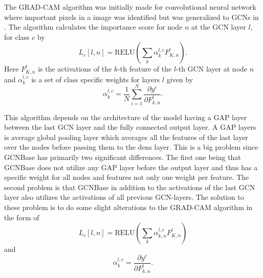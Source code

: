 The GRAD-CAM algorithm was initially made for convolutional neural network where important pixels in a image was identified \cite{} but was generalized to GCNs in \cite{}. The algorithm calculates the importance score for node $n$ at the GCN layer $l$, for class $c$ by 
\begin{equation*}
    L_c[l,n] =  \text{RELU}(\sum_k \alpha^{l, c}_k F_{K,n}^l). 
\end{equation*}
Here $F_{K,n}^l$ is the activations of the $k$-th feature of the $l$-th GCN layer at node $n$ and $\alpha^{l, c}_k$ is a set of class specific weights for layers $l$ given by 
\begin{equation*}
    \alpha^{l, c}_k = \frac{1}{N}\sum_{i = 1}^N \frac{\partial y^c}{\partial F^l_{k,n}}.
\end{equation*}

This algorithm depends on the architecture of the model having a GAP layer between the last GCN layer and the fully connected output layer. A GAP layers is average global pooling layer which averages all the features of the last layer over the nodes before passing them to the dens layer. This is a big problem since GCNBase has primarily two significant differences. The first one being that GCNBase does not utilize any GAP layer before the output layer and thus has a specific weight for all nodes and features not only one weight per feature. The second problem is that GCNBase in addition to the activations of the last GCN layer also utilizes the activations of all previous GCN-layers. The solution to these problem is to do some slight alterations to the GRAD-CAM algorithm in the form of 
\begin{equation*}
    L_c[l,n] =  \text{RELU}(\sum_k \alpha^{l, c}_{k,n} F_{K,n}^l)
\end{equation*}
and
\begin{equation*}
    \alpha^{l, c}_k = \frac{\partial y^c}{\partial F^l_{k,n}}.
\end{equation*}
